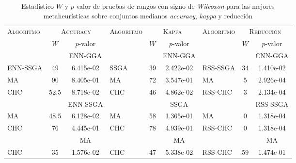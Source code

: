 \begin{table}[]
\centering
\begin{adjustbox}{max width =\textwidth}
\begin{tabular}{l c c|l c c| l c c}
\hline
	  \textsc{Algoritmo}
	& \multicolumn{2}{c}{\textsc{Accuracy}}
	& \multicolumn{1}{|c}{\textsc{Algoritmo}}
	& \multicolumn{2}{c}{\textsc{Kappa}}
	& \multicolumn{1}{|c}{\textsc{Algoritmo}}
	& \multicolumn{2}{c}{\textsc{Reducción}}\\ 
 & $W$ & $p$-valor & & $W$ & $p$-valor & & $W$ & $p$-valor  \\
\hline
\hline

 & & ENN-GGA & & & ENN-GGA & & & CNN-GGA \\

ENN-SSGA & 49 & 6.415e-02 & SSGA & 39 & 2.422e-02 &  RSS-SSGA & 34 & 1.410e-02 \\
MA & 90 & 8.405e-01 & MA & 72 & 3.547e-01 & MA & 5 & 2.926e-04 \\
CHC & 52.5 & 8.718e-02 & CHC & 46 & 4.862e-02 & RSS-CHC & 3 & 2.134e-04 \\

\hline
 
  & & ENN-SSGA & & & SSGA & & & RSS-SSGA \\

MA & 48.5 & 6.128e-02 & MA & 58 & 1.365e-01 & MA & 0 & 1.318e-04 \\
CHC & 76 & 4.445e-01 & CHC & 78 & 4.939e-01 & RSS-CHC & 0 & 1.318e-04 \\

\hline

  & & MA & & & MA & & & MA \\

CHC & 35 & 1.576e-02 & CHC & 47 & 5.338e-02 & RSS-CHC & 59 & 1.474e-01 \\

\hline

\end{tabular}
\end{adjustbox}
\caption[Pruebas de \emph{Wilcoxon} entre las mejores metaheurísticas para los conjuntos medianos sobre \emph{accuracy}, \emph{kappa} y reducción]{Estadístico $W$ y $p$-valor de pruebas de rangos con signo de \emph{Wilcoxon} para las mejores metaheurísticas sobre conjuntos medianos \emph{accuracy}, \emph{kappa} y reducción}
\label{wilcox1-all-med}
\end{table}


